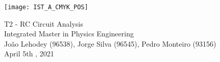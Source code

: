 
\thispagestyle {empty}

\texttt{[image: IST\_A\_CMYK\_POS]}

\begin{center}
%
\vspace{1.0cm}

\vspace{1cm}
{\FontLb T2 - RC Circuit Analysis} \\ %
\vspace{1cm}
{\FontSn Integrated Master in Physics Engineering} \\ %
\vspace{1cm}
{\FontSn João Lehodey (96538), Jorge Silva (96545), Pedro Monteiro (93156)} \\
\vspace{1cm}
{\FontSn April 5th , 2021} \\ %
%
\end{center}

